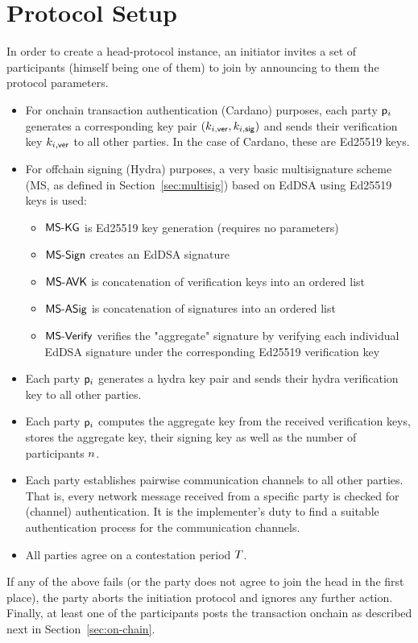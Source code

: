 
\section{Protocol Setup}\label{sec:setup}
In order to create a head-protocol instance, an initiator invites a set of
participants (himself being one of them) to join by announcing to them the
protocol parameters.

\begin{itemize}
  \item For onchain transaction authentication (Cardano) purposes, each party $\mathsf p_i$ generates a
        corresponding key pair $(k_{i,\mathsf{ver}},k_{i,\mathsf{sig}})$ and sends their verification key $k_{i,\mathsf{ver}}$ to all other parties. In the case of Cardano, these are Ed25519 keys.

  \item For offchain signing (Hydra) purposes, a very basic multisignature scheme (MS, as defined in Section~\ref{sec:multisig}) based on EdDSA using Ed25519 keys is used:
        \begin{itemize}
          \item $\mathsf{MS\textsf{-}{}KG}$ is Ed25519 key generation (requires no parameters)
          \item $\mathsf{MS\textsf{-}{}Sign}$ creates an EdDSA signature
          \item $\mathsf{MS\textsf{-}{}AVK}$ is concatenation of verification keys into an ordered list
          \item $\mathsf{MS\textsf{-}{}ASig}$ is concatenation of signatures into an ordered list
          \item $\mathsf{MS\textsf{-}{}Verify}$ verifies the "aggregate" signature by verifying each individual EdDSA signature under the corresponding Ed25519 verification key
        \end{itemize}
        
  \item Each party $\mathsf p_i$ generates a hydra key pair and sends their hydra verification key to all other parties.

  \item Each party $\mathsf p_i$ computes the aggregate key from the received verification keys, stores the aggregate key,
        their signing key as well as the number of participants $n$.
        
  \item Each party establishes pairwise communication channels to all other parties. That is, every network message received from a specific party is checked for (channel) authentication. It is the implementer’s duty to find a suitable authentication process for the communication channels.
  
  \item All parties agree on a contestation period $T$.
\end{itemize}

If any of the above fails (or the party does not agree to join the head in the
first place), the party aborts the initiation protocol and ignores any further
action. Finally, at least one of the participants posts the \mtxInit{} transaction
onchain as described next in Section~\ref{sec:on-chain}.

